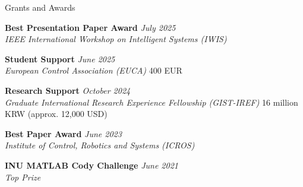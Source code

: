 \documentclass{resume} %
\begin{document}
\begin{rSection}{Grants and Awards}

\small{

    {\bf Best Presentation Paper Award} 
        \hfill 
        {\em July 2025} 
        \\
        {\textit {IEEE International Workshop on Intelligent Systems (IWIS)}} 

    {\bf Student Support} 
        \hfill 
        {\em June 2025} 
        \\
        {\textit {European Control Association (EUCA)}}
        \hfill 
        {400 EUR}

    {\bf Research Support} 
        \hfill 
        {\em October 2024} 
        \\
        {\textit {Graduate International Research Experience Fellowship (GIST-IREF)}}
        \hfill 
        {16 million KRW (approx. 12,000 USD)}
        
    {\bf Best Paper Award} 
        \hfill 
        {\em June 2023} 
        \\
        {\textit {Institute of Control, Robotics and Systems (ICROS)}} 

    {\bf INU MATLAB Cody Challenge} 
        \hfill 
        {\em June 2021} 
        \\
        {\textit {Top Prize}} 

}

\end{rSection}
\end{document}
